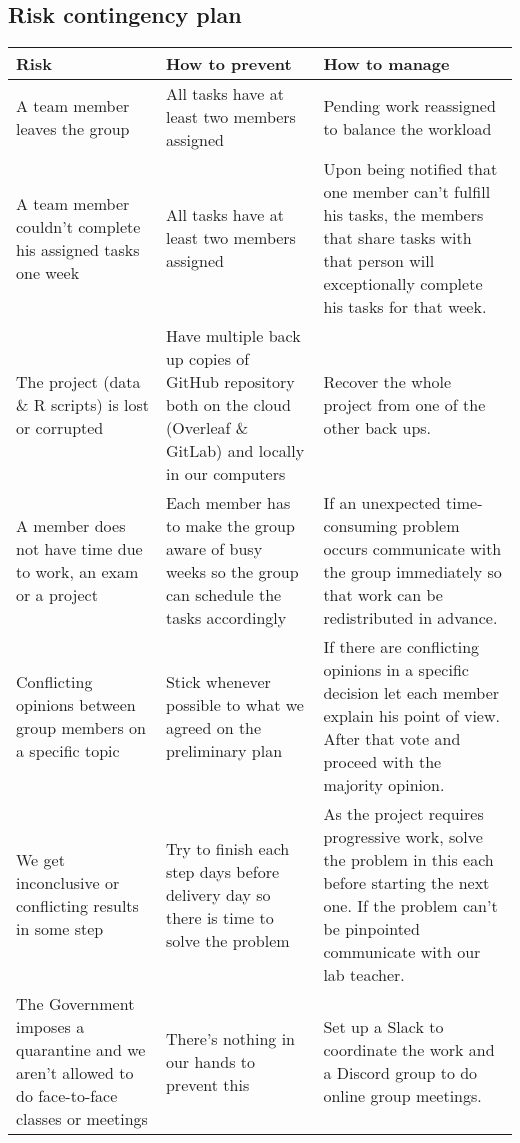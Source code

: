 \subsection{Risk contingency plan}%
\label{sub:risk_contingency_plan}


\begin{table}[H]
\centering
\begin{tabular}{@{}p{5cm}p{5cm}p{5cm}@{}}
\toprule
Risk & How to prevent & How to manage \\ \midrule
A team member leaves the group & All tasks have at least two members assigned & Pending work reassigned to balance the workload\\
\addlinespace[0.5em]
A team member couldn't complete his assigned tasks one week & All tasks have at least two members assigned & Upon being notified that one member can't fulfill his tasks, the members that share tasks with that person will exceptionally complete his tasks for that week.\\
\addlinespace[0.5em]
The project (data \& R scripts) is lost or corrupted & Have multiple back up copies of GitHub repository both on the cloud (Overleaf \& GitLab) and locally in our computers & Recover the whole project from one of the other back ups.\\
\addlinespace[0.5em]
A member does not have time due to work, an exam or a project & Each member has to make the group aware of busy weeks so the group can schedule the tasks accordingly & If an unexpected time-consuming problem occurs communicate with the group immediately so that work can be redistributed in advance.\\
\addlinespace[0.5em]
Conflicting opinions between group members on a specific topic & Stick whenever possible to what we agreed on the preliminary plan & If there are conflicting opinions in a specific decision let each member explain his point of view. After that vote and proceed with the majority opinion.\\
\addlinespace[0.5em]
We get inconclusive or conflicting results in some step & Try to finish each step days before delivery day so there is time to solve the problem & As the project requires progressive work, solve the problem in this each before starting the next one. If the problem can't be pinpointed communicate with our lab teacher.  
\\
\addlinespace[0.5em]
The Government imposes a quarantine and we aren't allowed to do face-to-face classes or meetings & There's nothing in our hands to prevent this & Set up a Slack to coordinate the work and a Discord group to do online group meetings.\\

\bottomrule
\end{tabular}
\end{table}


